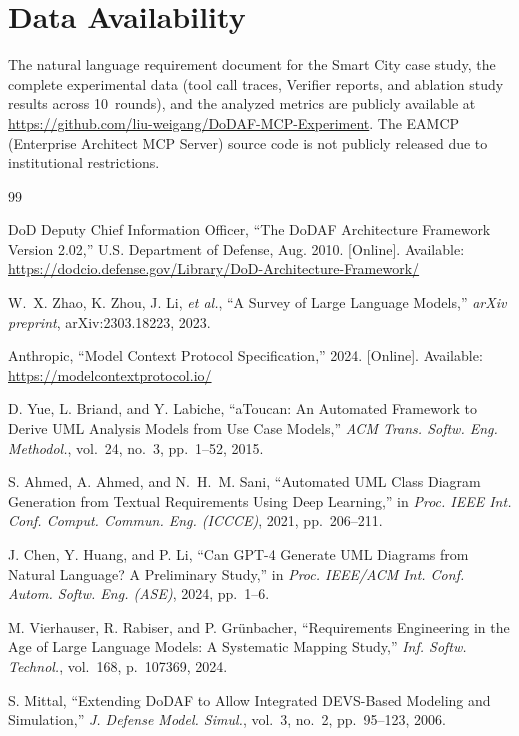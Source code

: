 \documentclass{ieeeaccess}
\begin{document}
\section*{Data Availability}
The natural language requirement document for the Smart City case study, the complete experimental data (tool call traces, Verifier reports, and ablation study results across 10~rounds), and the analyzed metrics are publicly available at \url{https://github.com/liu-weigang/DoDAF-MCP-Experiment}. The EAMCP (Enterprise Architect MCP Server) source code is not publicly released due to institutional restrictions.

\begin{thebibliography}{99}

DoD Deputy Chief Information Officer, ``The DoDAF Architecture Framework Version 2.02,'' U.S. Department of Defense, Aug. 2010. [Online]. Available: \url{https://dodcio.defense.gov/Library/DoD-Architecture-Framework/}

W.~X. Zhao, K. Zhou, J. Li, \textit{et al.}, ``A Survey of Large Language Models,'' \textit{arXiv preprint}, arXiv:2303.18223, 2023.

Anthropic, ``Model Context Protocol Specification,'' 2024. [Online]. Available: \url{https://modelcontextprotocol.io/}

D. Yue, L. Briand, and Y. Labiche, ``aToucan: An Automated Framework to Derive UML Analysis Models from Use Case Models,'' \textit{ACM Trans. Softw. Eng. Methodol.}, vol.~24, no.~3, pp.~1--52, 2015.

S. Ahmed, A. Ahmed, and N.~H.~M. Sani, ``Automated UML Class Diagram Generation from Textual Requirements Using Deep Learning,'' in \textit{Proc. IEEE Int. Conf. Comput. Commun. Eng. (ICCCE)}, 2021, pp.~206--211.

J. Chen, Y. Huang, and P. Li, ``Can GPT-4 Generate UML Diagrams from Natural Language? A Preliminary Study,'' in \textit{Proc. IEEE/ACM Int. Conf. Autom. Softw. Eng. (ASE)}, 2024, pp.~1--6.

M. Vierhauser, R. Rabiser, and P. Gr\"{u}nbacher, ``Requirements Engineering in the Age of Large Language Models: A Systematic Mapping Study,'' \textit{Inf. Softw. Technol.}, vol.~168, p.~107369, 2024.

S. Mittal, ``Extending DoDAF to Allow Integrated DEVS-Based Modeling and Simulation,'' \textit{J. Defense Model. Simul.}, vol.~3, no.~2, pp.~95--123, 2006.


\end{thebibliography}
\end{document}
